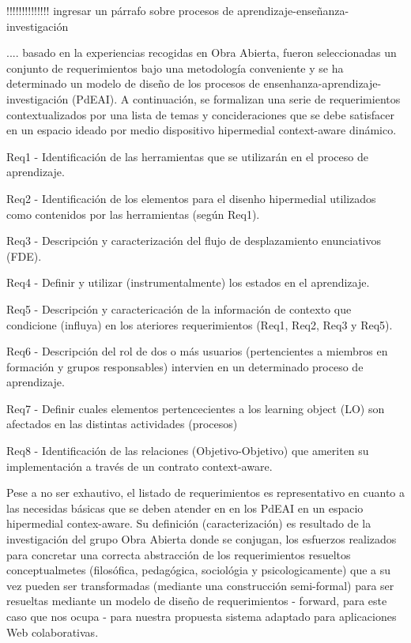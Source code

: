 \documentclass{llncs}
\begin{document}
!!!!!!!!!!!!!! ingresar un párrafo sobre procesos de aprendizaje-enseñanza-investigación

.... basado en la experiencias recogidas en Obra Abierta, fueron seleccionadas un conjunto de requerimientos bajo una metodología conveniente y se ha determinado un modelo de diseño de los procesos de ensenhanza-aprendizaje-investigación (PdEAI).  A continuación, se formalizan una serie de requerimientos contextualizados por una lista de temas y concideraciones que se debe satisfacer en un espacio ideado por medio dispositivo hipermedial context-aware dinámico.    

\begin{description}
\item Req1 - Identificación de las herramientas que se utilizarán en el proceso de aprendizaje.

\bigskip
\item Req2 - Identificación de los elementos para el disenho hipermedial utilizados como contenidos por las herramientas (según Req1).
\bigskip
\item Req3 - Descripción y caracterización del flujo de desplazamiento enunciativos (FDE).
\bigskip
\item Req4 - Definir y utilizar (instrumentalmente) los estados en el aprendizaje.

\bigskip
\item Req5 - Descripción y caractericación de la información de contexto que condicione (influya) en los ateriores requerimientos (Req1, Req2, Req3 y Req5).

\bigskip
\item Req6 - Descripción del rol de dos o más usuarios (pertencientes a miembros en formación y grupos responsables) intervien en un determinado proceso de aprendizaje. 

\bigskip
\item Req7 - Definir cuales elementos pertencecientes a los learning object (LO) son afectados en las distintas actividades (procesos) \cite{libro5}

\bigskip
\item Req8 - Identificación de las relaciones (Objetivo-Objetivo) que ameriten su implementación a través de un contrato context-aware.

\end{description}

Pese a no ser exhautivo, el listado de requerimientos es representativo en cuanto a las necesidas básicas que se deben atender en en los PdEAI en un espacio hipermedial contex-aware. Su definición (caracterización) es resultado de la investigación del grupo Obra Abierta donde se conjugan, los esfuerzos realizados para concretar una correcta abstracción de los requerimientos resueltos conceptualmetes (filosófica, pedagógica, sociológia y psicologicamente)\cite{pato1} que a su vez pueden ser transformadas (mediante una construcción semi-formal) para ser resueltas mediante un  modelo de diseño de requerimientos - forward, para este caso que nos ocupa - para nuestra propuesta sistema adaptado para aplicaciones Web colaborativas.
\end{document}
